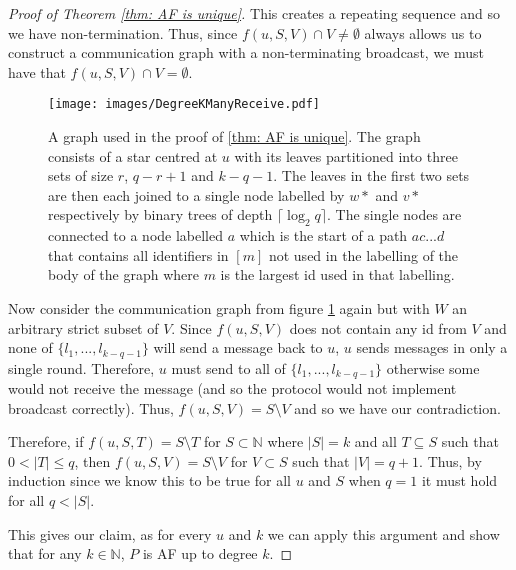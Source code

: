 \begin{proof}[Proof of Theorem \ref{thm: AF is unique}]
    This creates a repeating sequence and so we have non-termination. 
    Thus, since $f(u,S,V)\cap V\neq\emptyset$ always allows us to construct a communication graph with a non-terminating broadcast, we must have that $f(u,S,V)\cap V =\emptyset$.
    \begin{figure}
        \centering
        \texttt{[image: images/DegreeKManyReceive.pdf]}
        \caption{A graph used in the proof of \cref{thm: AF is unique}. The graph consists of a star centred at $u$ with its leaves partitioned into three sets of size $r$, $q-r+1$ and $k-q-1$. The  leaves in the first two sets are then each joined to a single node labelled by $w*$ and $v*$ respectively by binary trees of depth $\lceil \log_2{q}\rceil$. The single nodes are connected to a node labelled $a$ which is the start of a path $ac...d$ that contains all identifiers in $[m]$ not used in the labelling of the body of the graph where $m$ is the largest id used in that labelling.}
        \label{fig:Many-MessagesDegreeK}
    \end{figure}
    Now consider the communication graph from figure \ref{fig:Many-MessagesDegreeK} again but with $W$ an arbitrary strict subset of $V$.
    Since $f(u,S,V)$ does not contain any id from $V$ and none of $\{l_1,...,l_{k-q-1}\}$ will send a message back to $u$, $u$ sends messages in only a single round. 
    Therefore, $u$ must send to all of $\{l_1,...,l_{k-q-1}\}$ otherwise some would not receive the message (and so the protocol would not implement broadcast correctly). 
    Thus, $f(u,S,V)=S\setminus V$ and so we have our contradiction.

    Therefore, if $f(u,S,T)=S\setminus T$ for $S\subset \mathbb{N}$ where $|S|=k$ and all $T\subseteq S$ such that $0<|T|\leq q$, then $f(u,S,V)=S\setminus V$ for $V\subset S$ such that $|V|=q+1$. 
    Thus, by induction since we know this to be true for all $u$ and $S$ when $q=1$ it must hold for all $q<|S|$.

    This gives our claim, as for every $u$ and $k$ we can apply this argument and show that for any $k \in \mathbb{N}$, $P$ is AF up to degree $k$.
\end{proof}